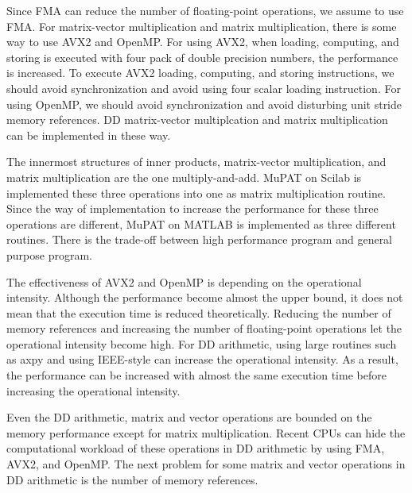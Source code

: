 \documentclass{IOS-Book-Article}
\begin{document}
Since FMA can reduce the number of floating-point operations, we assume to use FMA.  
For matrix-vector multiplication and matrix multiplication, there is some way to use AVX2 and OpenMP. 
For using AVX2, when loading, computing, and storing is executed with four pack of double precision numbers, the performance is increased. 
To execute AVX2 loading, computing, and storing instructions, we should avoid synchronization and avoid using four scalar loading instruction. 
For using OpenMP, we should avoid synchronization and avoid disturbing unit stride memory references.
DD matrix-vector multiplcation and matrix multiplication can be implemented in these way. 

The innermost structures of inner products, matrix-vector multiplication, and matrix multiplication are the one multiply-and-add. MuPAT on Scilab is implemented these three operations into one as matrix multiplication routine. Since the way of implementation to increase the performance for these three operations are different, MuPAT on MATLAB is implemented as three different routines. There is the trade-off between high performance program and general purpose program.

The effectiveness of AVX2 and OpenMP is depending on the operational intensity. 
Although the performance become almost the upper bound, it does not mean that the execution time is reduced theoretically. Reducing the number of memory references and increasing the number of floating-point operations let the operational intensity become high. For DD arithmetic, using large routines such as axpy and using IEEE-style can increase the operational intensity. As a result, the performance can be increased with almost the same execution time before increasing the operational intensity. 

Even the DD arithmetic, matrix and vector operations are bounded on the memory performance except for matrix multiplication. Recent CPUs can hide the computational workload of these operations in DD arithmetic by using FMA, AVX2, and OpenMP. The next problem for some matrix and vector operations in DD arithmetic is the number of memory references. 
\end{document}
